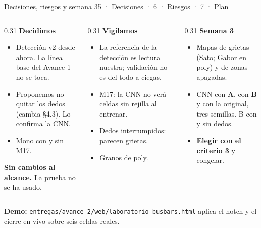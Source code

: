 \documentclass[aspectratio=169,11pt]{beamer}
\newcommand{\cab}[1]{{\color{ud}\bfseries #1}\par\vspace{-2pt}{\color{ud}\rule{\linewidth}{0.4pt}}\par\vspace{2pt}}
\begin{document}
\begin{frame}{Decisiones, riesgos y semana 3}{5 · Decisiones · 6 · Riesgos · 7 · Plan}
  \begin{columns}[t]
    \begin{column}{0.31\textwidth}
      \cab{Decidimos}
      \footnotesize
      \begin{itemize}
        \item Detección v2 desde ahora. La línea base del Avance 1 no se toca.
        \item Proponemos no quitar los dedos (cambia §4.3). Lo confirma la CNN.
        \item Mono con y sin M17.
      \end{itemize}
      {\color{ud}\bfseries Sin cambios al alcance.} La prueba no se ha usado.
    \end{column}
    \begin{column}{0.31\textwidth}
      \cab{Vigilamos}
      \footnotesize
      \begin{itemize}
        \item La referencia de la detección es lectura nuestra; validación no es del todo a ciegas.
        \item M17: la CNN no verá celdas sin rejilla al entrenar.
        \item Dedos interrumpidos: parecen grietas.
        \item Granos de poly.
      \end{itemize}
    \end{column}
    \begin{column}{0.31\textwidth}
      \cab{Semana 3}
      \footnotesize
      \begin{itemize}
        \item Mapas de grietas (Sato; Gabor en poly) y de zonas apagadas.
        \item CNN con \textbf{A}, con \textbf{B} y con la original, tres semillas. B con y sin dedos.
        \item \textbf{Elegir con el criterio 3} y congelar.
      \end{itemize}
    \end{column}
  \end{columns}
  \vspace{0.25cm}
  \footnotesize\textbf{Demo:} \texttt{entregas/avance\_2/web/laboratorio\_busbars.html} aplica el notch y el cierre en vivo sobre seis celdas reales.
\end{frame}
\end{document}

